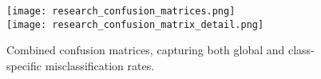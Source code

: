 \documentclass[11pt]{article}
\begin{document}
\begin{figure}[h!]
  \centering
  \texttt{[image: research\_confusion\_matrices.png]}\\
  \texttt{[image: research\_confusion\_matrix\_detail.png]}
  \caption{Combined confusion matrices, capturing both global and class-specific misclassification rates.}
\end{figure}
\end{document}
